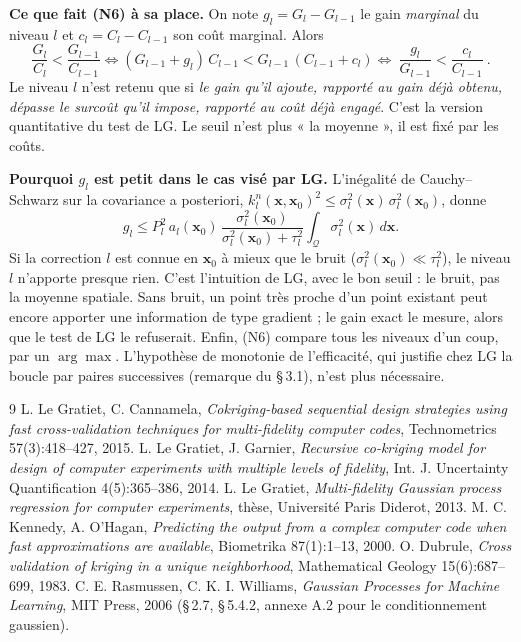 \documentclass[10pt,a4paper]{article}
\newcommand{\vx}{\bm{x}}
\newcommand{\Q}{\mathcal{Q}}
\begin{document}
\textbf{Ce que fait (N6) à sa place.} On note $g_l=G_l-G_{l-1}$ le gain \emph{marginal} du niveau $l$ et
$c_l=C_l-C_{l-1}$ son coût marginal. Alors
\[
  \frac{G_l}{C_l}<\frac{G_{l-1}}{C_{l-1}}
  \iff (G_{l-1}+g_l)\,C_{l-1}<G_{l-1}\,(C_{l-1}+c_l)
  \iff \boxed{\ \frac{g_l}{G_{l-1}}<\frac{c_l}{C_{l-1}}\ }.
\]
Le niveau $l$ n'est retenu que si \emph{le gain qu'il ajoute, rapporté au gain déjà obtenu, dépasse le
surcoût qu'il impose, rapporté au coût déjà engagé}. C'est la version quantitative du test de LG. Le seuil
n'est plus « la moyenne », il est fixé par les coûts.

\textbf{Pourquoi $g_l$ est petit dans le cas visé par LG.} L'inégalité de Cauchy–Schwarz sur la covariance a
posteriori, $k^n_l(\vx,\vx_0)^2\le\sigma_l^2(\vx)\,\sigma_l^2(\vx_0)$, donne
\[
  g_l\le P_l^2\,a_l(\vx_0)\,\frac{\sigma_l^2(\vx_0)}{\sigma_l^2(\vx_0)+\tau_l^2}\int_\Q\sigma_l^2(\vx)\,d\vx .
\]
Si la correction $l$ est connue en $\vx_0$ à mieux que le bruit ($\sigma_l^2(\vx_0)\ll\tau_l^2$), le niveau
$l$ n'apporte presque rien. C'est l'intuition de LG, avec le bon seuil : le bruit, pas la moyenne spatiale.
Sans bruit, un point très proche d'un point existant peut encore apporter une information de type gradient ;
le gain exact le mesure, alors que le test de LG le refuserait. Enfin, (N6) compare tous les niveaux d'un
coup, par un $\arg\max$. L'hypothèse de monotonie de l'efficacité, qui justifie chez LG la boucle par paires
successives (remarque du §\,3.1), n'est plus nécessaire.

{\small
\begin{thebibliography}{9}\setlength{\itemsep}{0.05em}
 L. Le Gratiet, C. Cannamela, \emph{Cokriging-based sequential design strategies using fast
  cross-validation techniques for multi-fidelity computer codes}, Technometrics 57(3):418–427, 2015.
 L. Le Gratiet, J. Garnier, \emph{Recursive co-kriging model for design of computer experiments
  with multiple levels of fidelity}, Int. J. Uncertainty Quantification 4(5):365–386, 2014.
 L. Le Gratiet, \emph{Multi-fidelity Gaussian process regression for computer experiments},
  thèse, Université Paris Diderot, 2013.
 M. C. Kennedy, A. O'Hagan, \emph{Predicting the output from a complex computer code when fast
  approximations are available}, Biometrika 87(1):1–13, 2000.
 O. Dubrule, \emph{Cross validation of kriging in a unique neighborhood}, Mathematical Geology
  15(6):687–699, 1983.
 C. E. Rasmussen, C. K. I. Williams, \emph{Gaussian Processes for Machine Learning}, MIT Press,
  2006 (§\,2.7, §\,5.4.2, annexe A.2 pour le conditionnement gaussien).
\end{thebibliography}}
\end{document}
